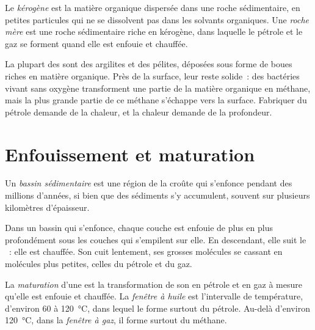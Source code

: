 \begin{definition}\label{def:g11:fossil-fuel-geology:source-rock}
Le \emph{kérogène} est la matière organique
dispersée dans une roche sédimentaire, en petites particules qui ne se
dissolvent pas dans les solvants organiques. Une \emph{roche
mère} est une roche
sédimentaire riche en kérogène, dans laquelle le pétrole et le gaz se
forment quand elle est enfouie et chauffée.
\end{definition}

La plupart des  sont des argilites et des pélites, déposées
sous forme de boues riches en matière organique. Près de la surface, leur
 reste solide~: des bactéries vivant sans oxygène transforment une
partie de la matière organique en méthane, mais la plus grande partie de ce
méthane s'échappe vers la surface. Fabriquer du pétrole demande de la
chaleur, et la chaleur demande de la profondeur.

\section{Enfouissement et maturation}

\begin{definition}\label{def:g11:fossil-fuel-geology:basin}
Un \emph{bassin sédimentaire}
est une région de la croûte qui s'enfonce pendant des millions d'années, si
bien que des sédiments s'y accumulent, souvent sur plusieurs kilomètres
d'épaisseur.
\end{definition}

Dans un bassin qui s'enfonce, chaque couche est enfouie de plus en plus
profondément sous les couches qui s'empilent sur elle. En descendant, elle
suit le ~: elle est chauffée. Son  cuit lentement, ses
grosses molécules se cassant en molécules plus petites, celles du pétrole
et du gaz.

\begin{definition}\label{def:g11:fossil-fuel-geology:oil-window}
La \emph{maturation} d'une  est la
transformation de son  en pétrole et en gaz à mesure qu'elle est
enfouie et chauffée. La \emph{fenêtre à huile}
est l'intervalle de température, d'environ 60 à
\qty{120}{\degreeCelsius}, dans lequel le  forme surtout du
pétrole. Au-delà d'environ \qty{120}{\degreeCelsius}, dans la
\emph{fenêtre à gaz}, il forme surtout
du méthane.
\end{definition}

